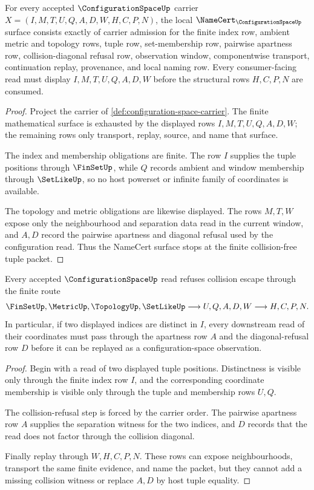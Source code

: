 \begin{theorem}
\label{thm:configuration-space-namecert-obligations}
For every accepted $\ConfigurationSpaceUp$ carrier $X=(I,M,T,U,Q,A,D,W,H,C,P,N)$, the local $\NameCert_{\ConfigurationSpaceUp}$ surface consists exactly of carrier admission for the finite index row, ambient metric and topology rows, tuple row, set-membership row, pairwise apartness row, collision-diagonal refusal row, observation window, componentwise transport, continuation replay, provenance, and local naming row. Every consumer-facing read must display $I,M,T,U,Q,A,D,W$ before the structural rows $H,C,P,N$ are consumed.
\end{theorem}
\begin{proof}
Project the carrier of \autoref{def:configuration-space-carrier}. The finite mathematical surface is exhausted by the displayed rows $I,M,T,U,Q,A,D,W$; the remaining rows only transport, replay, source, and name that surface.

The index and membership obligations are finite. The row $I$ supplies the tuple positions through $\FinSetUp$, while $Q$ records ambient and window membership through $\SetLikeUp$, so no host powerset or infinite family of coordinates is available.

The topology and metric obligations are likewise displayed. The rows $M,T,W$ expose only the neighbourhood and separation data read in the current window, and $A,D$ record the pairwise apartness and diagonal refusal used by the configuration read. Thus the NameCert surface stops at the finite collision-free tuple packet.
\end{proof}

\begin{theorem}
\label{thm:configuration-space-collision-nonescape}
Every accepted $\ConfigurationSpaceUp$ read refuses collision escape through the finite route
$$
\FinSetUp,\MetricUp,\TopologyUp,\SetLikeUp
  \longrightarrow U,Q,A,D,W
  \longrightarrow H,C,P,N .
$$
In particular, if two displayed indices are distinct in $I$, every downstream read of their coordinates must pass through the apartness row $A$ and the diagonal-refusal row $D$ before it can be replayed as a configuration-space observation.
\end{theorem}
\begin{proof}
Begin with a read of two displayed tuple positions. Distinctness is visible only through the finite index row $I$, and the corresponding coordinate membership is visible only through the tuple and membership rows $U,Q$.

The collision-refusal step is forced by the carrier order. The pairwise apartness row $A$ supplies the separation witness for the two indices, and $D$ records that the read does not factor through the collision diagonal.

Finally replay through $W,H,C,P,N$. These rows can expose neighbourhoods, transport the same finite evidence, and name the packet, but they cannot add a missing collision witness or replace $A,D$ by host tuple equality.
\end{proof}

